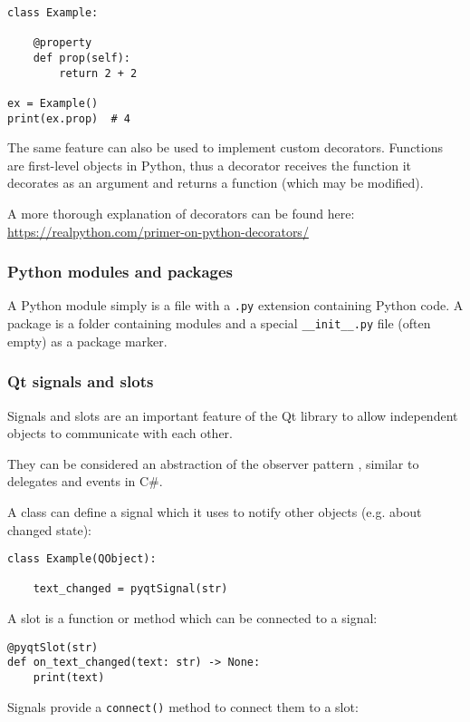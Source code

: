 \begin{verbatim}
class Example:

    @property
    def prop(self):
        return 2 + 2

ex = Example()
print(ex.prop)  # 4
\end{verbatim}

The same feature can also be used to implement custom decorators. Functions are
first-level objects in Python, thus a decorator receives the function it
decorates as an argument and returns a function (which may be modified).

A more thorough explanation of decorators can be found here: \\
\url{https://realpython.com/primer-on-python-decorators/}

\subsubsection{Python modules and packages}
A Python module simply is a file with a \verb|.py| extension containing Python
code. A package is a folder containing modules and a special \verb|__init__.py|
file (often empty) as a package marker.

\subsubsection{Qt signals and slots}
Signals and slots are an important feature of the Qt library to allow
independent objects to communicate with each other.

They can be considered an abstraction of the observer pattern
\autocite[293ff]{gof}, similar to delegates and events in C\#.

A class can define a signal which it uses to notify other objects (e.g. about
changed state):

\begin{verbatim}
class Example(QObject):

    text_changed = pyqtSignal(str)
\end{verbatim}

A slot is a function or method which can be connected to a signal:

\begin{verbatim}
@pyqtSlot(str)
def on_text_changed(text: str) -> None:
    print(text)
\end{verbatim}

Signals provide a \verb|connect()| method to connect them to a slot:

